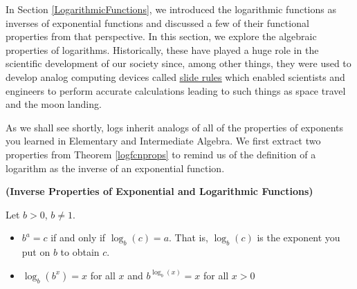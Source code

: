 \documentclass{ximera}
\begin{document}
	\author{Stitz-Zeager}




\setcounter{footnote}{0}

\label{PropertiesofLogarithms}

In Section \ref{LogarithmicFunctions}, we introduced the logarithmic functions as inverses of exponential functions and discussed a few of their functional properties from that perspective.  In this section, we explore the algebraic properties of logarithms.  Historically, these have played a huge role in the scientific development of our society since, among other things, they were used to develop analog computing devices called \href{http://en.wikipedia.org/wiki/Slide_rule}{\underline{slide rules}} which enabled scientists and engineers to perform accurate calculations leading to such things as space travel and the moon landing.  

\smallskip

As we shall see shortly, logs inherit analogs of all of the properties of exponents you learned in Elementary and Intermediate Algebra.  We first extract two properties from Theorem \ref{logfcnprops} to remind us of the definition of a logarithm as the inverse of an exponential function.
\smallskip

\colorbox{ResultColor}{\bbm

\begin{thm}  \label{invpropslogs} \textbf{(Inverse Properties of Exponential and Logarithmic Functions)} 

Let $b > 0$, $b \neq 1$. 

\vspace{-.1in}

\begin{itemize}

\item   $b^{a} = c$ if and only if $\log_{b}(c) = a$.   That is, $\log_{b}(c)$ is the exponent you put on $b$ to obtain $c$.

\item  $\log_{b} \left(b^{x}\right) = x$ for all $x$ and $b^{\log_{b}(x)} = x$ for all $x > 0$

\end{itemize}

\end{thm}

\ebm}
\end{document}
